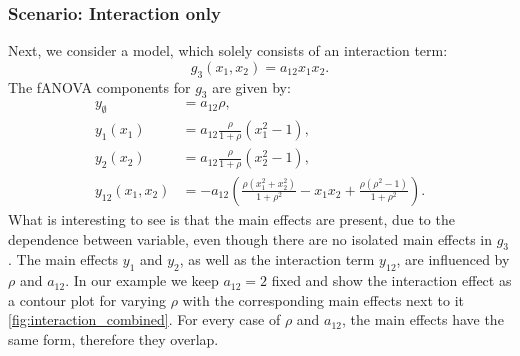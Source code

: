 \subsubsection*{Scenario: Interaction only}
Next, we consider a model, which solely consists of an interaction term:
$$g_3(x_1, x_2) = a_{12} x_1 x_2.$$
The fANOVA components for $g_3$ are given by:
\begin{align*}
    y_{\emptyset} &= a_{12} \rho, \\
    y_{1}(x_1) &= a_{12} \frac{\rho}{1+ \rho} (x_1^2 - 1), \\
    y_{2}(x_2) &= a_{12} \frac{\rho}{1+ \rho} (x_2^2 - 1), \\
    y_{12}(x_1,x_2) 
&= -a_{12}\!\left(
    \frac{\rho(x_1^2+x_2^2)}{1+\rho^2} 
    - x_1 x_2 
    + \frac{\rho(\rho^2-1)}{1+\rho^2}
   \right).
\end{align*}
What is interesting to see is that the main effects are present, due to the dependence between variable, even though there are no isolated main effects in $g_3$.
The main effects $y_1$ and $y_2$, as well as the interaction term $y_{12}$, are influenced by $\rho$ and $a_{12}$.
In our example we keep $a_{12} = 2$ fixed and show the interaction effect as a contour plot for varying $\rho$ with the corresponding main effects next to it \autoref{fig:interaction_combined}. For every case of $\rho$ and $a_{12}$, the main effects have the same form, therefore they overlap.
